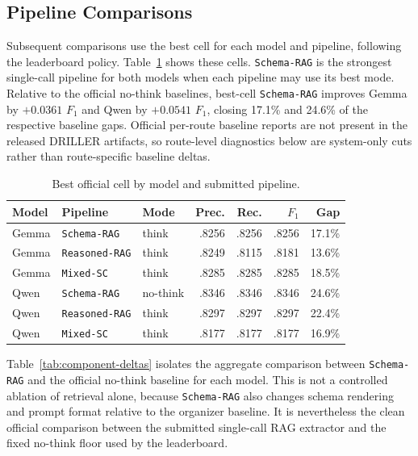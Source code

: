 \subsection{Pipeline Comparisons}

Subsequent comparisons use the best cell for each model and pipeline, following the leaderboard policy. Table~\ref{tab:best-pipeline-cells} shows these cells. \texttt{Schema-RAG} is the strongest single-call pipeline for both models when each pipeline may use its best mode. Relative to the official no-think baselines, best-cell \texttt{Schema-RAG} improves Gemma by \(+0.0361\) \(F_1\) and Qwen by \(+0.0541\) \(F_1\), closing 17.1\% and 24.6\% of the respective baseline gaps. Official per-route baseline reports are not present in the released DRILLER artifacts, so route-level diagnostics below are system-only cuts rather than route-specific baseline deltas.

\begin{table}[!htbp]
\centering
\caption{Best official cell by model and submitted pipeline.}
\label{tab:best-pipeline-cells}
\scriptsize
\begin{tabular}{@{}lllrrrr@{}}
\toprule
Model & Pipeline & Mode & Prec. & Rec. & \(F_1\) & Gap \\
\midrule
Gemma & \texttt{Schema-RAG} & think & .8256 & .8256 & .8256 & 17.1\% \\
Gemma & \texttt{Reasoned-RAG} & think & .8249 & .8115 & .8181 & 13.6\% \\
Gemma & \texttt{Mixed-SC} & think & .8285 & .8285 & .8285 & 18.5\% \\
\midrule
Qwen & \texttt{Schema-RAG} & no-think & .8346 & .8346 & .8346 & 24.6\% \\
Qwen & \texttt{Reasoned-RAG} & think & .8297 & .8297 & .8297 & 22.4\% \\
Qwen & \texttt{Mixed-SC} & think & .8177 & .8177 & .8177 & 16.9\% \\
\bottomrule
\end{tabular}
\end{table}

Table~\ref{tab:component-deltas} isolates the aggregate comparison between \texttt{Schema-RAG} and the official no-think baseline for each model. This is not a controlled ablation of retrieval alone, because \texttt{Schema-RAG} also changes schema rendering and prompt format relative to the organizer baseline. It is nevertheless the clean official comparison between the submitted single-call RAG extractor and the fixed no-think floor used by the leaderboard.

